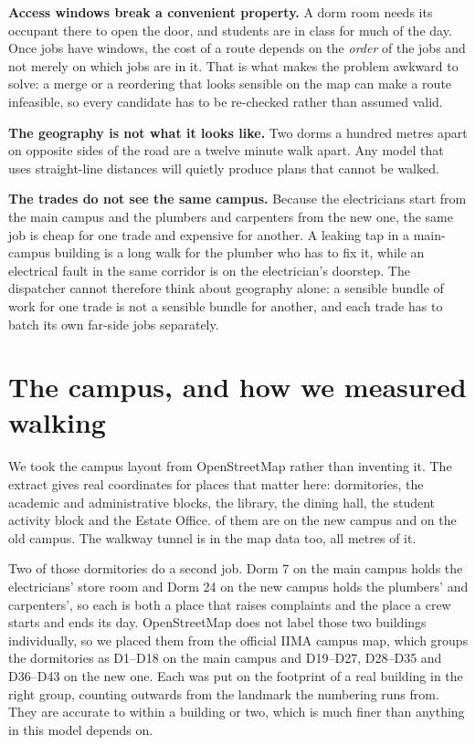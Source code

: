 \documentclass[11pt]{article}
\begin{document}
\textbf{Access windows break a convenient property.} A dorm room needs its
occupant there to open the door, and students are in class for much of the
day. Once jobs have windows, the cost of a route depends on the \emph{order}
of the jobs and not merely on which jobs are in it. That is what makes the
problem awkward to solve: a merge or a reordering that looks sensible on the
map can make a route infeasible, so every candidate has to be re-checked
rather than assumed valid.

\textbf{The geography is not what it looks like.} Two dorms a hundred metres
apart on opposite sides of the road are a twelve minute walk apart. Any model
that uses straight-line distances will quietly produce plans that cannot be
walked.

\textbf{The trades do not see the same campus.} Because the electricians
start from the main campus and the plumbers and carpenters from the new one,
the same job is cheap for one trade and expensive for another. A leaking tap
in a main-campus building is a long walk for the plumber who has to fix it,
while an electrical fault in the same corridor is on the electrician's
doorstep. The dispatcher cannot therefore think about geography alone: a
sensible bundle of work for one trade is not a sensible bundle for another,
and each trade has to batch its own far-side jobs separately.

\section{The campus, and how we measured walking}

We took the campus layout from OpenStreetMap rather than inventing it. The
extract gives real coordinates for \NLocations{} places that matter here:
\NDorms{} dormitories, the academic and administrative blocks, the library,
the dining hall, the student activity block and the Estate Office.
\NNewCampus{} of them are on the new campus and \NOldCampus{} on the old
campus. The walkway tunnel is in the map data too, all \NTunnelMetres{}
metres of it.

Two of those dormitories do a second job. Dorm 7 on the main campus holds the
electricians' store room and Dorm 24 on the new campus holds the plumbers'
and carpenters', so each is both a place that raises complaints and the place
a crew starts and ends its day. OpenStreetMap does not label those two
buildings individually, so we placed them from the official IIMA campus map,
which groups the dormitories as D1--D18 on the main campus and D19--D27,
D28--D35 and D36--D43 on the new one. Each was put on the footprint of a real
building in the right group, counting outwards from the landmark the
numbering runs from. They are accurate to within a building or two, which is
much finer than anything in this model depends on.
\end{document}

